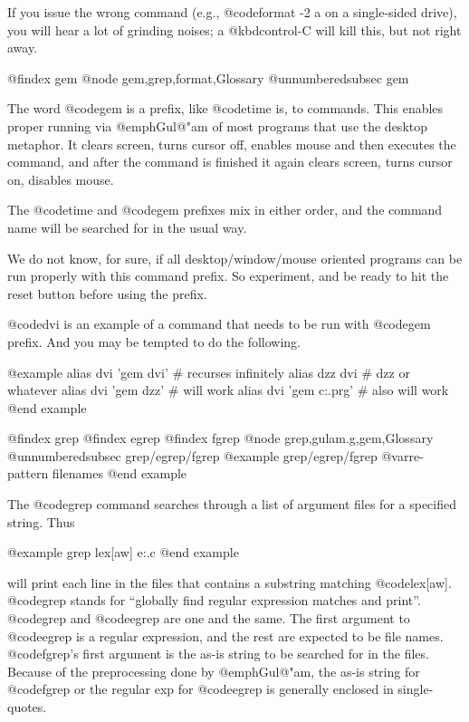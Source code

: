 {{If you issue the wrong command (e.g., @code{format -2 a} on a single-sided
drive), you will hear a lot of grinding noises; a @kbd{control-C} will kill
this, but not right away.

@findex gem
@node gem,grep,format,Glossary
@unnumberedsubsec gem

The word @code{gem} is a prefix, like @code{time} is, to commands.  This
enables proper running via @emph{Gul@"am} of most programs that use the
desktop metaphor.  It clears screen, turns cursor off, enables mouse and
then executes the command, and after the command is finished it again
clears screen, turns cursor on, disables mouse.

The @code{time} and @code{gem} prefixes mix in either order, and the
command name will be searched for in the usual way.

We do not know, for sure, if all desktop/window/mouse oriented programs can
be run properly with this command prefix.  So experiment, and be ready to
hit the reset button before using the prefix.

@code{dvi} is an example of a command that needs to be run with @code{gem}
prefix.  And you may be tempted to do the following.

@example
alias dvi 'gem dvi'                   # recurses infinitely 
alias dzz dvi                         # dzz or whatever 
alias dvi 'gem dzz'                   # will work 
alias dvi 'gem c:\bin\dvi.prg'        # also will work 
@end example

@findex grep
@findex egrep
@findex fgrep
@node grep,gulam.g,gem,Glossary
@unnumberedsubsec grep/egrep/fgrep
@example
grep/egrep/fgrep @var{re-pattern filenames}
@end example

The @code{grep} command searches through a list of argument files for a
specified string.  Thus

@example
grep lex[aw] e:\gulam\*.c 
@end example

will print each line in the files that contains a substring matching
@code{lex[aw]}. @code{grep} stands for ``globally find regular expression
matches and print''. @code{grep} and @code{egrep} are one and the same.
The first argument to @code{egrep} is a regular expression, and the rest
are expected to be file names. @code{fgrep}'s first argument is the as-is
string to be searched for in the files.  Because of the preprocessing done
by @emph{Gul@"am}, the as-is string for @code{fgrep} or the regular exp for
@code{egrep} is generally enclosed in single-quotes.

}}
